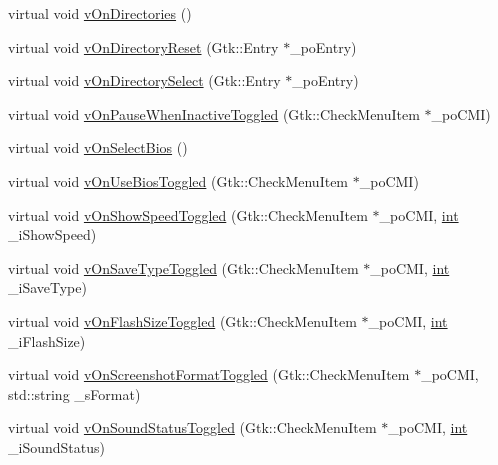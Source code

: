 \begin{DoxyCompactItemize}
\item 
virtual void \mbox{\hyperlink{class_v_b_a_1_1_window_ab0ff6c3b3ac5df7ab482be673ac02732}{v\+On\+Directories}} ()
\item 
virtual void \mbox{\hyperlink{class_v_b_a_1_1_window_aedc6f08a9c1f1a54ec41347f96dfd213}{v\+On\+Directory\+Reset}} (Gtk\+::\+Entry $\ast$\+\_\+po\+Entry)
\item 
virtual void \mbox{\hyperlink{class_v_b_a_1_1_window_ab2aa067d967ea52a685574fc09c11f33}{v\+On\+Directory\+Select}} (Gtk\+::\+Entry $\ast$\+\_\+po\+Entry)
\item 
virtual void \mbox{\hyperlink{class_v_b_a_1_1_window_aec8ba72231d668912f3b71353925f2f2}{v\+On\+Pause\+When\+Inactive\+Toggled}} (Gtk\+::\+Check\+Menu\+Item $\ast$\+\_\+po\+C\+MI)
\item 
virtual void \mbox{\hyperlink{class_v_b_a_1_1_window_a5d20c67c2118e4a18e97cab4ba111c65}{v\+On\+Select\+Bios}} ()
\item 
virtual void \mbox{\hyperlink{class_v_b_a_1_1_window_a4c3cba9990c0f7315b49d2c8d338280b}{v\+On\+Use\+Bios\+Toggled}} (Gtk\+::\+Check\+Menu\+Item $\ast$\+\_\+po\+C\+MI)
\item 
virtual void \mbox{\hyperlink{class_v_b_a_1_1_window_a81a46aa6f68c512ed86aa04ca13dbd71}{v\+On\+Show\+Speed\+Toggled}} (Gtk\+::\+Check\+Menu\+Item $\ast$\+\_\+po\+C\+MI, \mbox{\hyperlink{_util_8cpp_a0ef32aa8672df19503a49fab2d0c8071}{int}} \+\_\+i\+Show\+Speed)
\item 
virtual void \mbox{\hyperlink{class_v_b_a_1_1_window_ac28bedaab2e51b684869e85b4b20b7be}{v\+On\+Save\+Type\+Toggled}} (Gtk\+::\+Check\+Menu\+Item $\ast$\+\_\+po\+C\+MI, \mbox{\hyperlink{_util_8cpp_a0ef32aa8672df19503a49fab2d0c8071}{int}} \+\_\+i\+Save\+Type)
\item 
virtual void \mbox{\hyperlink{class_v_b_a_1_1_window_a592d046d6e85921562d26285387cc45a}{v\+On\+Flash\+Size\+Toggled}} (Gtk\+::\+Check\+Menu\+Item $\ast$\+\_\+po\+C\+MI, \mbox{\hyperlink{_util_8cpp_a0ef32aa8672df19503a49fab2d0c8071}{int}} \+\_\+i\+Flash\+Size)
\item 
virtual void \mbox{\hyperlink{class_v_b_a_1_1_window_a8536700b1c3ab6cd07b8fd14bf3d3d82}{v\+On\+Screenshot\+Format\+Toggled}} (Gtk\+::\+Check\+Menu\+Item $\ast$\+\_\+po\+C\+MI, std\+::string \+\_\+s\+Format)
\item 
virtual void \mbox{\hyperlink{class_v_b_a_1_1_window_af883be4dc5fbd611a2b5610aa26cfff7}{v\+On\+Sound\+Status\+Toggled}} (Gtk\+::\+Check\+Menu\+Item $\ast$\+\_\+po\+C\+MI, \mbox{\hyperlink{_util_8cpp_a0ef32aa8672df19503a49fab2d0c8071}{int}} \+\_\+i\+Sound\+Status)

\end{DoxyCompactItemize}
